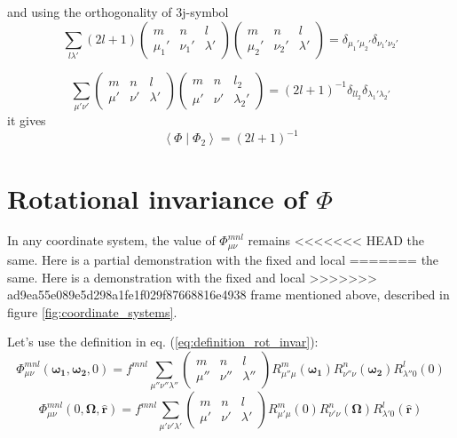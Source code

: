 and using the orthogonality of 3j-symbol \citep{Edmonds}
\begin{equation}
\sum_{l\lambda'}\left(2l+1\right)\left(\begin{array}{ccc}
m & n & l\\
\mu_{1}' & \nu_{1}' & \lambda'
\end{array}\right)\left(\begin{array}{ccc}
m & n & l\\
\mu_{2}' & \nu_{2}' & \lambda'
\end{array}\right)=\delta_{\mu_{1}'\mu_{2}'}\delta_{\nu_{1}'\nu_{2}'}
\end{equation}


\begin{equation}
\sum_{\mu'\nu'}\left(\begin{array}{ccc}
m & n & l\\
\mu' & \nu' & \lambda'
\end{array}\right)\left(\begin{array}{ccc}
m & n & l_{2}\\
\mu' & \nu' & \lambda_{2}'
\end{array}\right)=\left(2l+1\right)^{-1}\delta_{ll_{2}}\delta_{\lambda_{1}'\lambda_{2}'}
\end{equation}
it gives
\begin{equation}
\left\langle \Phi\mid\Phi_{2}\right\rangle =\left(2l+1\right)^{-1}
\end{equation}



\section{Rotational invariance of $\Phi$}

In any coordinate system, the value of $\Phi_{\mu\nu}^{mnl}$ remains
<<<<<<< HEAD
the same. Here is a partial demonstration with the fixed and local
=======
the same. Here is a demonstration with the fixed and local
>>>>>>> ad9ea55e089e5d298a1fe1f029f87668816e4938
frame mentioned above, described in figure \ref{fig:coordinate_systems}.

Let's use the definition in eq. (\ref{eq:definition_rot_invar}):
\begin{equation}
\Phi_{\mu\nu}^{mnl}(\boldsymbol{\omega_{1}},\boldsymbol{\omega_{2}},0)=f^{mnl}\sum_{\mu''\nu''\lambda''}\left(\begin{array}{ccc}
m & n & l\\
\mu'' & \nu'' & \lambda''
\end{array}\right)R_{\mu''\mu}^{m}(\boldsymbol{\omega_{1}})R_{\nu''\nu}^{n}(\boldsymbol{\omega_{2}})R_{\lambda''0}^{l}(0)
\end{equation}
\begin{equation}
\Phi_{\mu\nu}^{mnl}(0,\mathbf{\Omega},\mathbf{\hat{r}})=f^{mnl}\sum_{\mu'\nu'\lambda'}\left(\begin{array}{ccc}
m & n & l\\
\mu' & \nu' & \lambda'
\end{array}\right)R_{\mu'\mu}^{m}(0)R_{\nu'\nu}^{n}(\mathbf{\Omega})R_{\lambda'0}^{l}(\mathbf{\hat{r}})
\end{equation}


